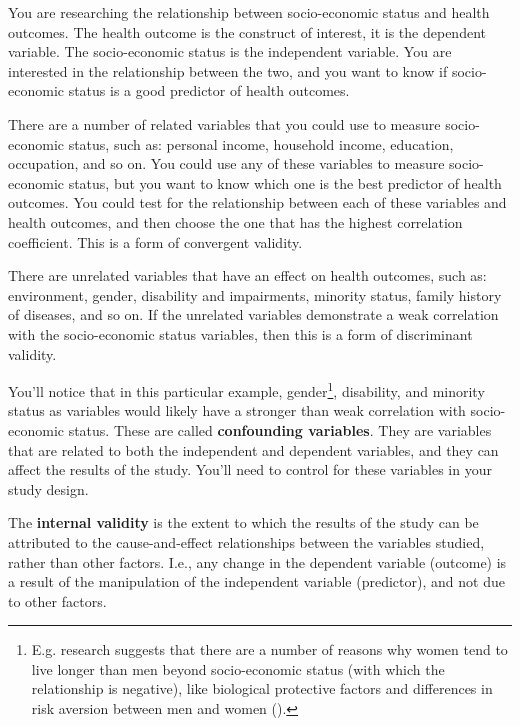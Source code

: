\documentclass[
  11pt,
  a4paper,
  twoside,symmetric,openright]{book}
\theoremstyle{break}
\theoremstyle{break}
\begin{document}
\begin{example}
\protect\hypertarget{exm:exconstructvalidity}{}\label{exm:exconstructvalidity}You are researching the relationship between socio-economic status and health outcomes. The health outcome is the construct of interest, it is the dependent variable. The socio-economic status is the independent variable. You are interested in the relationship between the two, and you want to know if socio-economic status is a good predictor of health outcomes.

There are a number of related variables that you could use to measure socio-economic status, such as: personal income, household income, education, occupation, and so on. You could use any of these variables to measure socio-economic status, but you want to know which one is the best predictor of health outcomes. You could test for the relationship between each of these variables and health outcomes, and then choose the one that has the highest correlation coefficient. This is a form of convergent validity.

There are unrelated variables that have an effect on health outcomes, such as: environment, gender, disability and impairments, minority status, family history of diseases, and so on. If the unrelated variables demonstrate a weak correlation with the socio-economic status variables, then this is a form of discriminant validity.

You'll notice that in this particular example, gender\footnote{E.g. research suggests that there are a number of reasons why women tend to live longer than men beyond socio-economic status (with which the relationship is negative), like biological protective factors and differences in risk aversion between men and women ().}, disability, and minority status as variables would likely have a stronger than weak correlation with socio-economic status. These are called \textbf{confounding variables}. They are variables that are related to both the independent and dependent variables, and they can affect the results of the study. You'll need to control for these variables in your study design.
\end{example}

\begin{definition}
\protect\hypertarget{def:definternalvalidity}{}\label{def:definternalvalidity}The \textbf{internal validity} is the extent to which the results of the study can be attributed to the cause-and-effect relationships between the variables studied, rather than other factors. I.e., any change in the dependent variable (outcome) is a result of the manipulation of the independent variable (predictor), and not due to other factors.
\end{definition}
\end{document}
